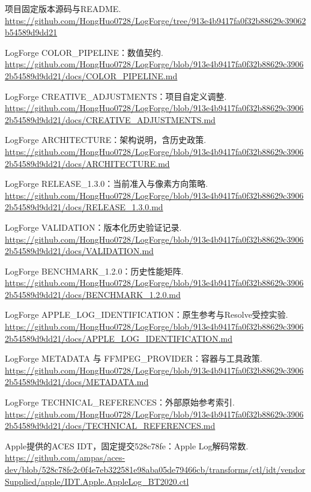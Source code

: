 \documentclass[UTF8,zihao=-4,openany]{ctexbook}
\begin{document}
\par [1] 项目固定版本源码与README. \url{https://github.com/HongHuo0728/LogForge/tree/913e4b9417fa0f32b88629c39062b54589d9dd21}\par
\par [2] LogForge COLOR\_PIPELINE：数值契约. \url{https://github.com/HongHuo0728/LogForge/blob/913e4b9417fa0f32b88629c39062b54589d9dd21/docs/COLOR_PIPELINE.md}\par
\par [3] LogForge CREATIVE\_ADJUSTMENTS：项目自定义调整. \url{https://github.com/HongHuo0728/LogForge/blob/913e4b9417fa0f32b88629c39062b54589d9dd21/docs/CREATIVE_ADJUSTMENTS.md}\par
\par [4] LogForge ARCHITECTURE：架构说明，含历史政策. \url{https://github.com/HongHuo0728/LogForge/blob/913e4b9417fa0f32b88629c39062b54589d9dd21/docs/ARCHITECTURE.md}\par
\par [5] LogForge RELEASE\_1.3.0：当前准入与像素方向策略. \url{https://github.com/HongHuo0728/LogForge/blob/913e4b9417fa0f32b88629c39062b54589d9dd21/docs/RELEASE_1.3.0.md}\par
\par [6] LogForge VALIDATION：版本化历史验证记录. \url{https://github.com/HongHuo0728/LogForge/blob/913e4b9417fa0f32b88629c39062b54589d9dd21/docs/VALIDATION.md}\par
\par [7] LogForge BENCHMARK\_1.2.0：历史性能矩阵. \url{https://github.com/HongHuo0728/LogForge/blob/913e4b9417fa0f32b88629c39062b54589d9dd21/docs/BENCHMARK_1.2.0.md}\par
\par [8] LogForge APPLE\_LOG\_IDENTIFICATION：原生参考与Resolve受控实验. \url{https://github.com/HongHuo0728/LogForge/blob/913e4b9417fa0f32b88629c39062b54589d9dd21/docs/APPLE_LOG_IDENTIFICATION.md}\par
\par [9] LogForge METADATA 与 FFMPEG\_PROVIDER：容器与工具政策. \url{https://github.com/HongHuo0728/LogForge/blob/913e4b9417fa0f32b88629c39062b54589d9dd21/docs/METADATA.md}\par
\par [10] LogForge TECHNICAL\_REFERENCES：外部原始参考索引. \url{https://github.com/HongHuo0728/LogForge/blob/913e4b9417fa0f32b88629c39062b54589d9dd21/docs/TECHNICAL_REFERENCES.md}\par
\par [11] Apple提供的ACES IDT，固定提交528c78fe：Apple Log解码常数. \url{https://github.com/ampas/aces-dev/blob/528c78fe2c0f4e7eb322581e98aba05de79466cb/transforms/ctl/idt/vendorSupplied/apple/IDT.Apple.AppleLog_BT2020.ctl}\par
\end{document}
